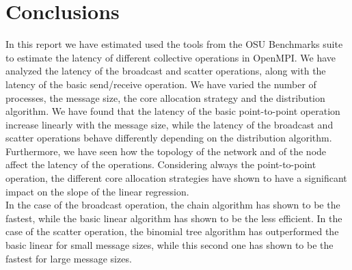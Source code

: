 \section{Conclusions}
    In this report we have estimated used the tools from the OSU
    Benchmarks suite to estimate the latency of different collective
    operations in OpenMPI. We have analyzed the latency of the
    broadcast and scatter operations, along with the latency of the
    basic send/receive operation. We have varied the number of
    processes, the message size, the core allocation strategy and
    the distribution algorithm. We have found that the latency of
    the basic point-to-point operation increase linearly
    with the message size, while the latency of the broadcast and
    scatter operations behave differently depending on the
    distribution algorithm.\\
    Furthermore, we have seen how the topology of the network
    and of the node affect the latency of the operations. Considering
    always the point-to-point operation, the different core allocation
    strategies have shown to have a significant impact on the slope
    of the linear regression. \\
    In the case of the broadcast operation, the chain algorithm
    has shown to be the fastest, while the basic linear algorithm
    has shown to be the less efficient. In the case of the scatter
    operation, the binomial tree algorithm has outperformed the
    basic linear for small message sizes, while this second one
    has shown to be the fastest for large message sizes. \\
    



